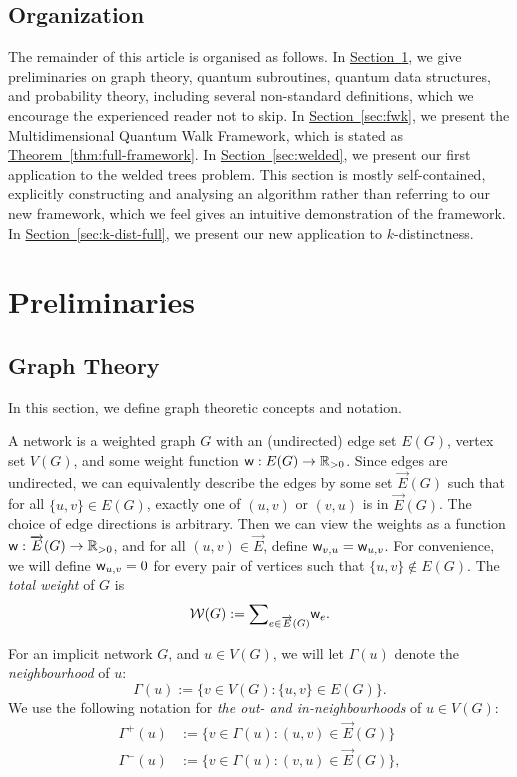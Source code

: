 \documentclass{theoretics}
\renewcommand{\sec}[1]{\hyperref[sec:#1]{Section~\ref*{sec:#1}}}
\newcommand{\thm}[1]{\hyperref[thm:#1]{Theorem~\ref*{thm:#1}}}
\renewcommand{\>}{\rangle}
\newcommand{\<}{\langle}
\renewcommand{\(}{\left(}
\renewcommand{\)}{\right)}
\def\w{{\sf w}}
\begin{document}
\subsection{Organization}

The remainder of this article is organised as follows. In \sec{prelim}, we give preliminaries on graph theory, quantum subroutines, quantum data structures, and probability theory, including several non-standard definitions, which we encourage the experienced reader not to skip. In \sec{fwk}, we present the Multidimensional Quantum Walk Framework, which is stated as \thm{full-framework}. In \sec{welded}, we present our first application to the welded trees problem. This section is mostly self-contained, explicitly constructing and analysing an algorithm rather than referring to our new framework, which we feel gives an intuitive demonstration of the framework. In \sec{k-dist-full}, we present our new application to $k$-distinctness.

\section{Preliminaries}\label{sec:prelim}

\subsection{Graph Theory}\label{sec:prelim-graph}

In this section, we define graph theoretic concepts and notation. 


\begin{definition}[Network]\label{def:network}
A network is a weighted graph $G$ with an (undirected) edge set $E(G)$, vertex set $V(G)$, and some weight function $\w:E(G)\rightarrow\mathbb{R}_{>0}$. Since edges are undirected, we can equivalently describe the edges by some set $\overrightarrow{E}(G)$ such that for all $\{u,v\}\in E(G)$, exactly one of $(u,v)$ or $(v,u)$ is in $\overrightarrow{E}(G)$. The choice of edge directions is arbitrary. Then we can view the weights as a function $\w:\overrightarrow{E}(G)\rightarrow\mathbb{R}_{> 0}$, and for all $(u,v)\in \overrightarrow{E}$, define $\w_{v,u}=\w_{u,v}$. For convenience, we will define $\w_{u,v}=0$ for every pair of vertices such that $\{u,v\}\not\in E(G)$. 
The \emph{total weight} of $G$ is 
$$\textstyle{\cal W}(G):={\displaystyle\sum}_{e\in \overrightarrow{E}(G)}\w_e.$$ 
\end{definition}

\noindent For an implicit network $G$, and $u\in V(G)$, we will let $\Gamma(u)$ denote the \emph{neighbourhood} of $u$:
$$\Gamma(u):=\{v\in V(G):\{u,v\}\in E(G)\}.$$
We use the following notation for \emph{the out- and in-neighbourhoods} of $u\in V(G)$:
\begin{equation}
\begin{split}
\Gamma^+(u) &:= \{v\in\Gamma(u):(u,v)\in \overrightarrow{E}(G)\}\\
\Gamma^-(u) &:= \{v\in\Gamma(u):(v,u)\in \overrightarrow{E}(G)\},
\end{split}\label{eq:neighbourhoods}
\end{equation}
\end{document}
